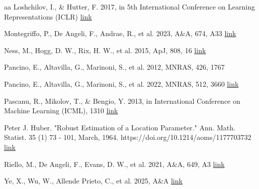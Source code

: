 \documentclass{aa}
\begin{document}
\begin{thebibliography}{aa}
    Loshchilov, I., \& Hutter, F. 2017, in 5th International Conference on Learning Representations (ICLR)
    \href{https://arxiv.org/abs/1608.03983}{link}
    
    Montegriffo, P., De Angeli, F., Andrae, R., et al. 2023, A\&A, 674, A33 \href{https://www.aanda.org/articles/aa/abs/2023/06/aa43709-22/aa43709-22.html}{link}

    Ness, M., Hogg, D. W., Rix, H. W., et al. 2015, ApJ, 808, 16
    \href{https://iopscience.iop.org/article/10.1088/0004-637X/808/1/16}{link}

    Pancino, E., Altavilla, G., Marinoni, S., et al. 2012, MNRAS, 426, 1767

    Pancino, E., Altavilla, G., Marinoni, S., et al. 2022, MNRAS, 512, 3660
    \href{https://ui.adsabs.harvard.edu/abs/2022yCat..75033660P/abstract}{link}
    
    Pascanu, R., Mikolov, T., \& Bengio, Y. 2013, in International Conference on Machine Learning (ICML), 1310 \href{https://proceedings.mlr.press/v28/pascanu13.html}{link}

    Peter J. Huber. "Robust Estimation of a Location Parameter." Ann. Math. Statist. 35 (1) 73 - 101, March, 1964. https://doi.org/10.1214/aoms/1177703732
    \href{https://openaccess.thecvf.com/content_iccv_2015/html/Girshick_Fast_R-CNN_ICCV_2015_paper.html}{link}
    

    Riello, M., De Angeli, F., Evans, D. W., et al. 2021, A\&A, 649, A3
    \href{https://ui.adsabs.harvard.edu/abs/2021A%26A...649A...3R/abstract}{link}
    
    Ye, X., Wu, W., Allende Prieto, C., et al. 2025, A\&A \href{https://www.aanda.org/articles/aa/full_html/2025/08/aa54410-25/aa54410-25.html}{link}

\end{thebibliography}
\end{document}
